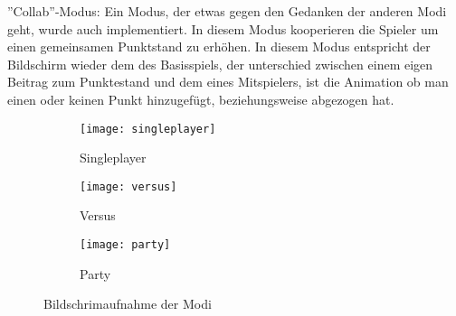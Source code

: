 \item''Collab''-Modus:\newline
Ein Modus, der etwas gegen den Gedanken der anderen Modi geht, wurde auch implementiert.  In diesem Modus kooperieren die Spieler um einen gemeinsamen Punktstand zu erhöhen. In diesem Modus entspricht der Bildschirm wieder dem des Basisspiels, der unterschied zwischen einem eigen Beitrag zum Punktestand und dem eines Mitspielers, ist die Animation ob man einen oder keinen Punkt hinzugefügt, beziehungsweise abgezogen hat.
\begin{figure}[h]
	\centering	
	\begin{subfigure}[a]{0.3\linewidth}
		\texttt{[image: singleplayer]}
		\caption{Singleplayer}
		\label{fig:singleplayer}
	\end{subfigure}	
	\begin{subfigure}[a]{0.3\linewidth}
		\texttt{[image: versus]}
		\caption{Versus}
		\label{fig:versus}
	\end{subfigure}
	\begin{subfigure}[a]{0.3\linewidth}
		\texttt{[image: party]}
		\caption{Party}
		\label{fig:party}
	\end{subfigure}	
	\caption{Bildschrimaufnahme der Modi}
\end{figure}


